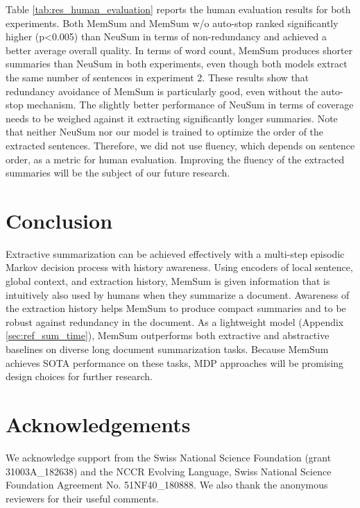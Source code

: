 \documentclass[11pt]{article}
\begin{document}
Table \ref{tab:res_human_evaluation} reports the human evaluation results for both experiments. Both MemSum and MemSum w/o auto-stop ranked significantly higher (p<0.005) than NeuSum in terms of non-redundancy and achieved a better average overall quality. In terms of word count, MemSum produces shorter summaries than NeuSum in both experiments, even though both models extract the same number of sentences in experiment 2. These results show that redundancy avoidance of MemSum is particularly good, even without the auto-stop mechanism. 
The slightly better performance of NeuSum in terms of coverage needs to be weighed against it extracting significantly longer summaries. Note that neither NeuSum nor our model is trained to optimize the order of the extracted sentences. 
Therefore, we did not use fluency, which depends on sentence order, as a metric for human evaluation. Improving the fluency of the extracted summaries will be the subject of our future research.

\section{Conclusion}

Extractive summarization can be achieved effectively with a multi-step episodic Markov decision process with history awareness. Using encoders of local sentence, global context, and extraction history,  MemSum is given information that is intuitively also used by humans when they summarize a document. Awareness of the extraction history helps MemSum to produce compact summaries and to be robust against redundancy in the document. As a lightweight model (Appendix \ref{sec:ref_sum_time}), MemSum outperforms both extractive and abstractive baselines on diverse long document summarization tasks. Because MemSum achieves SOTA performance on these tasks, MDP approaches will be promising design choices for further research.

\section*{Acknowledgements}
We acknowledge support from the Swiss National
Science Foundation (grant 31003A\_182638) and the NCCR Evolving Language, Swiss National Science Foundation Agreement No. 51NF40\_180888. We also thank the anonymous reviewers for their useful comments.





\appendix
\end{document}
